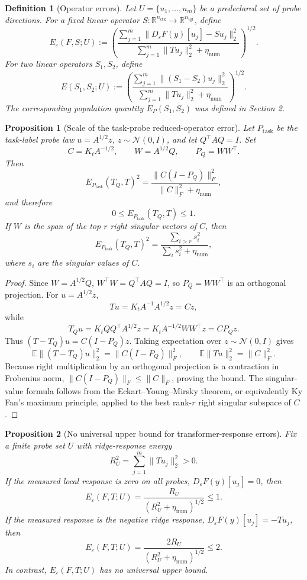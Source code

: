\documentclass[11pt]{article}
\newtheorem{definition}{Definition}
\newtheorem{proposition}{Proposition}
\newcommand{\R}{\mathbb{R}}
\begin{document}
\begin{definition}[Operator errors]
Let \(U=\{u_1,\ldots,u_m\}\) be a predeclared set of probe directions. For a fixed linear operator
\(S:\R^{n_{\mathrm{ctx}}}\to\R^{n_{\mathrm{tgt}}}\), define
\[
E_\varepsilon(F,S;U)
:=
\left(
\frac{
\sum_{j=1}^m \|D_\varepsilon F(y)[u_j]-Su_j\|_2^2
}{
\sum_{j=1}^m \|Tu_j\|_2^2+\eta_{\mathrm{num}}
}
\right)^{1/2}.
\]
For two linear operators \(S_1,S_2\), define
\[
E(S_1,S_2;U)
:=
\left(
\frac{
\sum_{j=1}^m \|(S_1-S_2)u_j\|_2^2
}{
\sum_{j=1}^m \|Tu_j\|_2^2+\eta_{\mathrm{num}}
}
\right)^{1/2}.
\]
The corresponding population quantity \(E_P(S_1,S_2)\) was defined in Section 2.
\end{definition}

\begin{proposition}[Scale of the task-probe reduced-operator error]
\label{prop:task-reduced-error-bound}
Let \(P_{\mathrm{task}}\) be the task-label probe law \(u=A^{1/2}z\), \(z\sim\mathcal{N}(0,I)\), and
let \(Q^\top A Q=I\). Set
\[
C=K_tA^{-1/2},\qquad W=A^{1/2}Q,\qquad P_Q=WW^\top .
\]
Then
\[
E_{P_{\mathrm{task}}}(T_Q,T)^2
=
\frac{\|C(I-P_Q)\|_F^2}{\|C\|_F^2+\eta_{\mathrm{num}}},
\]
and therefore
\[
0\le E_{P_{\mathrm{task}}}(T_Q,T)\le 1.
\]
If \(W\) is the span of the top \(r\) right singular vectors of \(C\), then
\[
E_{P_{\mathrm{task}}}(T_Q,T)^2
=
\frac{\sum_{i>r}s_i^2}{\sum_i s_i^2+\eta_{\mathrm{num}}},
\]
where \(s_i\) are the singular values of \(C\).
\end{proposition}

\begin{proof}
Since \(W=A^{1/2}Q\), \(W^\top W=Q^\top A Q=I\), so \(P_Q=WW^\top\) is an orthogonal projection.
For \(u=A^{1/2}z\),
\[
Tu=K_tA^{-1}A^{1/2}z=Cz,
\]
while
\[
T_Qu=K_tQQ^\top A^{1/2}z
=K_tA^{-1/2}WW^\top z
=CP_Qz.
\]
Thus \((T-T_Q)u=C(I-P_Q)z\). Taking expectation over \(z\sim\mathcal{N}(0,I)\) gives
\[
\mathbb{E}\|(T-T_Q)u\|_2^2=\|C(I-P_Q)\|_F^2,
\qquad
\mathbb{E}\|Tu\|_2^2=\|C\|_F^2.
\]
Because right multiplication by an orthogonal projection is a contraction in Frobenius norm,
\(\|C(I-P_Q)\|_F\le\|C\|_F\), proving the bound. The singular-value formula follows from the
Eckart--Young--Mirsky theorem, or equivalently Ky Fan's maximum principle, applied to the best
rank-\(r\) right singular subspace of \(C\).
\end{proof}

\begin{proposition}[No universal upper bound for transformer-response errors]
\label{prop:model-error-scale}
Fix a finite probe set \(U\) with ridge-response energy
\[
R_U^2=\sum_{j=1}^m\|Tu_j\|_2^2>0.
\]
If the measured local response is zero on all probes, \(D_\varepsilon F(y)[u_j]=0\), then
\[
E_\varepsilon(F,T;U)=\frac{R_U}{(R_U^2+\eta_{\mathrm{num}})^{1/2}}\le 1.
\]
If the measured response is the negative ridge response, \(D_\varepsilon F(y)[u_j]=-Tu_j\), then
\[
E_\varepsilon(F,T;U)=\frac{2R_U}{(R_U^2+\eta_{\mathrm{num}})^{1/2}}\le 2.
\]
In contrast, \(E_\varepsilon(F,T;U)\) has no universal upper bound.
\end{proposition}
\end{document}
